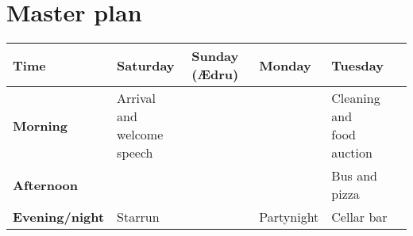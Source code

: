 \documentclass[../../main.tex]{subfiles}
\begin{document}
\section{Master plan}

\begin{center}
\begin{tabular}{|p{2.2cm}|p{2.5cm}|p{2.5cm}|p{2.5cm}|p{2.5cm}|p{2.5cm}|}
\hline
\textbf{Time}  & \textbf{Saturday}       & \textbf{Sunday (Ædru)}    & \textbf{Monday}   & \textbf{Tuesday}  \\ \hline
\textbf{Morning}  & \makecell[l]{Arrival and\\ welcome speech}  &  &            & \makecell[l]{Cleaning and\\food auction}  \\ \hline 
\textbf{Afternoon}&                                             &  &            & Bus and pizza                             \\ \hline 
\textbf{Evening/night}  & Starrun                              &  & Partynight  & Cellar bar                                \\ \hline
\end{tabular}
\end{center}
\end{document}
